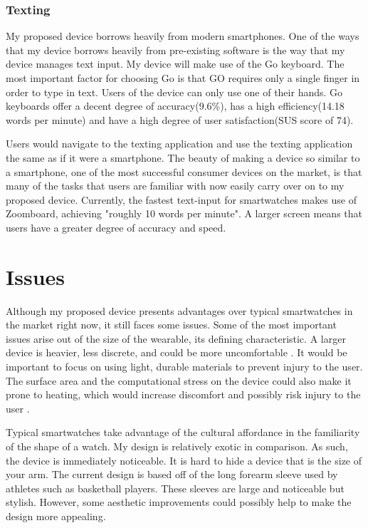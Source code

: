 \documentclass[11pt]{article}
\begin{document}
\subsubsection{Texting}
My proposed device borrows heavily from modern smartphones. One of the ways that my device borrows heavily from pre-existing software is the way that my device manages text input. My device will make use of the Go keyboard. The most important factor for choosing Go is that GO requires only a single finger in order to type in text. Users of the device can only use one of their hands. Go keyboards offer a decent degree of accuracy(9.6\%), has a high efficiency(14.18 words per minute) and have a high degree of user satisfaction(SUS score of 74)\cite{textInputSurvey}.

Users would navigate to the texting application and use the texting application the same as if it were a smartphone. The beauty of making a device so similar to a smartphone, one of the most successful consumer devices on the market, is that many of the tasks that users are familiar with now easily carry over on to my proposed device. Currently, the fastest text-input for smartwatches makes use of Zoomboard, achieving "roughly 10 words per minute"\cite{zoomboardVerdict}. A larger screen means that users have a greater degree of accuracy and speed.

\section{Issues}

Although my proposed device presents advantages over typical smartwatches in the market right now, it still faces some issues. Some of the most important issues arise out of the size of the wearable, its defining characteristic. A larger device is heavier, less discrete, and could be more uncomfortable \cite{WhyUsersDont}. It would be important to focus on using light, durable materials to prevent injury to the user. The surface area and the computational stress on the device could also make it prone to heating, which would increase discomfort and possibly risk injury to the user \cite{UserAcceptance}. 

Typical smartwatches take advantage of the cultural affordance in the familiarity of the shape of a watch. My design is relatively exotic in comparison. As such, the device is immediately noticeable. It is hard to hide a device that is the size of your arm. The current design is based off of the long forearm sleeve used by athletes such as basketball players. These sleeves are large and noticeable but stylish. However, some aesthetic improvements could possibly help to make the design more appealing. 
\end{document}
